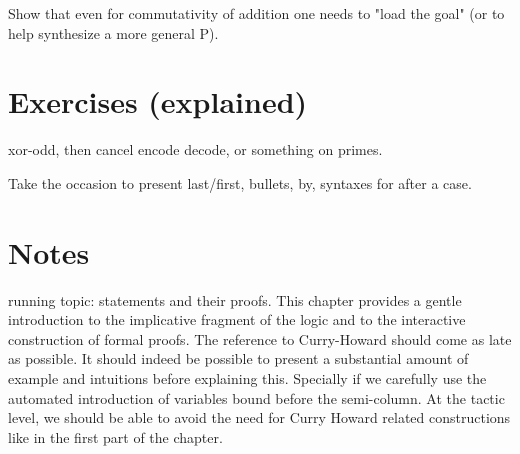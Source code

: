 Show that even for commutativity of addition one needs to
"load the goal" (or to help synthesize a more general P).


\section{Exercises (explained)}

xor-odd, then cancel encode decode, or something on primes.

Take the occasion to present last/first, bullets, by, syntaxes for
\C{=> [|IH x xs]} after a case.


\section{Notes}

%
%
%

running topic: statements and their proofs. This chapter provides a gentle
introduction to the implicative fragment of the logic and to the
interactive construction of formal proofs. The reference to
Curry-Howard should come as late as possible. It should indeed be
possible to present a substantial amount of example and intuitions
before explaining this. Specially if we carefully use the automated
introduction of variables bound before the semi-column. At the tactic
level, we should be able to avoid the need for Curry Howard related
constructions like  in the first part of the chapter.

